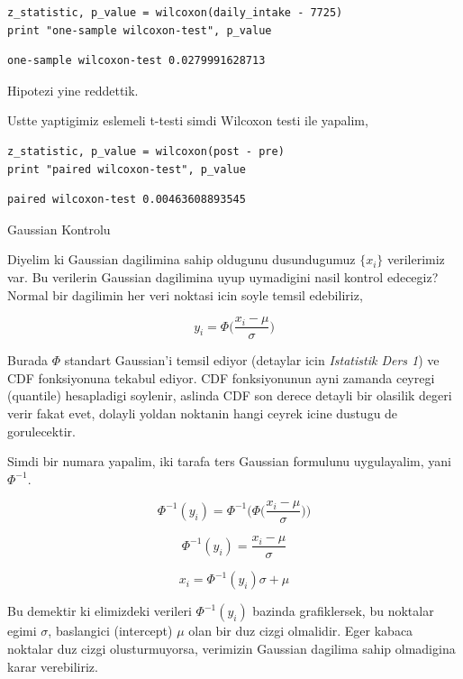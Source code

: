 \documentclass[12pt,fleqn]{article}\usepackage{../common}
\begin{document}
\begin{verbatim}
z_statistic, p_value = wilcoxon(daily_intake - 7725)
print "one-sample wilcoxon-test", p_value
\end{verbatim}

\begin{verbatim}
one-sample wilcoxon-test 0.0279991628713
\end{verbatim}

Hipotezi yine reddettik.

Ustte yaptigimiz eslemeli t-testi simdi Wilcoxon testi ile yapalim,

\begin{verbatim}
z_statistic, p_value = wilcoxon(post - pre)
print "paired wilcoxon-test", p_value
\end{verbatim}

\begin{verbatim}
paired wilcoxon-test 0.00463608893545
\end{verbatim}

Gaussian Kontrolu

Diyelim ki Gaussian dagilimina sahip oldugunu dusundugumuz $\{ x_i\}$
verilerimiz var. Bu verilerin Gaussian dagilimina uyup uymadigini nasil
kontrol edecegiz? Normal bir dagilimin her veri noktasi icin soyle temsil
edebiliriz,

$$ y_i = \Phi\bigg(\frac{ x_i - \mu}{\sigma}\bigg) $$

Burada $\Phi$ standart Gaussian'i temsil ediyor (detaylar icin
{\em Istatistik Ders 1}) ve CDF fonksiyonuna tekabul ediyor. CDF
fonksiyonunun ayni zamanda ceyregi (quantile) hesapladigi soylenir,
aslinda CDF son derece detayli bir olasilik degeri verir fakat evet,
dolayli yoldan noktanin hangi ceyrek icine dustugu de gorulecektir.

Simdi bir numara yapalim, iki tarafa ters Gaussian formulunu uygulayalim,
yani $\Phi^{-1}$.

$$ \Phi^{-1}(y_i) = \Phi^{-1}\bigg( \Phi\bigg(\frac{ x_i - \mu}{\sigma}\bigg)\bigg) $$

$$ \Phi^{-1}(y_i) = \frac{ x_i - \mu}{\sigma}$$

$$ x_i = \Phi^{-1}(y_i) \sigma + \mu  $$ 

Bu demektir ki elimizdeki verileri $\Phi^{-1}(y_i)$ bazinda grafiklersek,
bu noktalar egimi $\sigma$, baslangici (intercept) $\mu$ olan bir duz cizgi
olmalidir. Eger kabaca noktalar duz cizgi olusturmuyorsa, verimizin 
Gaussian dagilima sahip olmadigina karar verebiliriz. 
\end{document}
